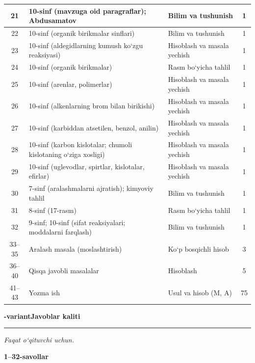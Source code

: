 \documentclass[11pt,a4paper]{article}
\newcommand{\hdrpill}[1]{\begin{tikzpicture}[baseline=0pt]\node[fill=ygreen,text=white,rounded corners=8pt,inner xsep=10pt,inner ysep=5pt,font=\fontsize{13}{15}\bfseries\selectfont] at (0,0.475){#1};\end{tikzpicture}}
\newcommand{\curvar}{}\fancyhead[R]{\hdrpill{\curvar}}
\begin{document}
{\begin{longtable}{|c|p{7.2cm}|p{5.4cm}|c|}
21 & 10-sinf (mavzuga oid paragraflar); Abdusamatov & Bilim va tushunish & 1\\\hline
22 & 10-sinf (organik birikmalar sinflari) & Bilim va tushunish & 1\\\hline
23 & 10-sinf (aldegidlarning kumush ko`zgu reaksiyasi) & Hisoblash va masala yechish & 1\\\hline
24 & 10-sinf (organik birikmalar) & Rasm bo`yicha tahlil & 1\\\hline
25 & 10-sinf (arenlar, polimerlar) & Hisoblash va masala yechish & 1\\\hline
26 & 10-sinf (alkenlarning brom bilan birikishi) & Hisoblash va masala yechish & 1\\\hline
27 & 10-sinf (karbiddan atsetilen, benzol, anilin) & Hisoblash va masala yechish & 1\\\hline
28 & 10-sinf (karbon kislotalar; chumoli kislotaning o`ziga xosligi) & Hisoblash va masala yechish & 1\\\hline
29 & 10-sinf (uglevodlar, spirtlar, kislotalar, efirlar) & Hisoblash va masala yechish & 1\\\hline
30 & 7-sinf (aralashmalarni ajratish); kimyoviy tahlil & Bilim va tushunish & 1\\\hline
31 & 8-sinf (17-rasm) & Rasm bo`yicha tahlil & 1\\\hline
32 & 9-sinf; 10-sinf (sifat reaksiyalari; moddalarni farqlash) & Bilim va tushunish & 1\\\hline
33--35 & Aralash masala (moslashtirish) & Ko`p bosqichli hisob & 3\\\hline
36--40 & Qisqa javobli masalalar & Hisoblash & 5\\\hline
41--43 & Yozma ish & Usul va hisob (M, A) & 75\\\hline
\end{longtable}}
\renewcommand{\curvar}{Javoblar}
\newpage
\noindent\textbf{\fontsize{13}{15}-variant}\hfill \textbf{Javoblar kaliti}\par\smallskip\hrule\smallskip
\textit{Faqat o`qituvchi uchun.}\par\medskip
\noindent\textbf{1--32-savollar}\par\smallskip
\end{document}
